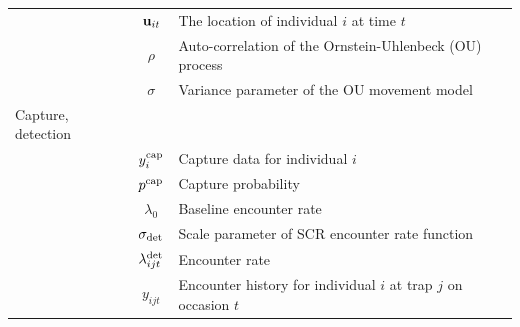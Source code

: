 \documentclass[12pt]{article}
\newcommand{\buit}{{\bf u}_{it}}
\begin{document}
\begin{table}[h!]
\begin{tabular}{p{3.5cm}cp{11cm}}
                            & $\buit$                   & The location of individual $i$ at time $t$                                        \\
                            & $\rho$                    & Auto-correlation of the Ornstein-Uhlenbeck (OU) process                           \\
                            & $\sigma$                  & Variance parameter of the OU movement model                                       \\
    Capture, detection      &                           &                                                                                   \\
                            & $y^{\rm cap}_i$           & Capture data for individual $i$                                                   \\
                            & $p^{\rm cap}$             & Capture probability                                                               \\
                            & $\lambda_0$               & Baseline encounter rate                                                           \\
                            & $\sigma_{\rm det}$        & Scale parameter of SCR encounter rate function                                    \\
                            & $\lambda^{\rm det}_{ijt}$ & Encounter rate                                                                    \\
                            & $y_{ijt}$                 & Encounter history for individual $i$ at trap $j$ on occasion $t$                  \\
    \hline
  \end{tabular}
  \label{tab:defs}
\end{table}


\clearpage
\end{document}
